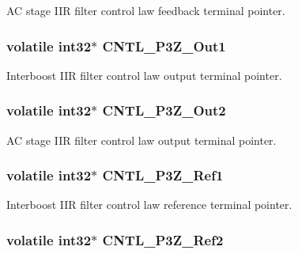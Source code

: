 A\-C stage I\-I\-R filter control law feedback terminal pointer. \hypertarget{a00010_acb0edbb1cfd2fb0e63ac2eb233dcd577}{
\subsubsection[{C\-N\-T\-L\-\_\-3\-P3\-Z\-\_\-\-Out1}]{\setlength{\rightskip}{0pt plus 5cm}volatile int32$\ast$ C\-N\-T\-L\-\_\-P3\-Z\-\_\-\-Out1}}\label{a00010_acb0edbb1cfd2fb0e63ac2eb233dcd577}
Interboost I\-I\-R filter control law output terminal pointer. \hypertarget{a00010_a92dd8eabeed10eaaaf60887d9bcbd76d}{
\subsubsection[{C\-N\-T\-L\-\_\-3\-P3\-Z\-\_\-\-Out2}]{\setlength{\rightskip}{0pt plus 5cm}volatile int32$\ast$ C\-N\-T\-L\-\_\-P3\-Z\-\_\-\-Out2}}\label{a00010_a92dd8eabeed10eaaaf60887d9bcbd76d}
A\-C stage I\-I\-R filter control law output terminal pointer. \hypertarget{a00010_a6ebe91dab023eff56cade0eddcd3e96d}{
\subsubsection[{C\-N\-T\-L\-\_\-3\-P3\-Z\-\_\-\-Ref1}]{\setlength{\rightskip}{0pt plus 5cm}volatile int32$\ast$ C\-N\-T\-L\-\_\-P3\-Z\-\_\-\-Ref1}}\label{a00010_a6ebe91dab023eff56cade0eddcd3e96d}
Interboost I\-I\-R filter control law reference terminal pointer. \hypertarget{a00010_a589e93bad0b8ba223e32ce590bba816b}{
\subsubsection[{C\-N\-T\-L\-\_\-3\-P3\-Z\-\_\-\-Ref2}]{\setlength{\rightskip}{0pt plus 5cm}volatile int32$\ast$ C\-N\-T\-L\-\_\-P3\-Z\-\_\-\-Ref2}}\label{a00010_a589e93bad0b8ba223e32ce590bba816b}
